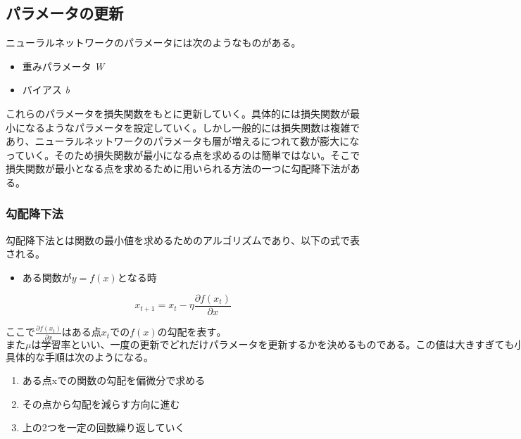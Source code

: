 \subsection{パラメータの更新}

ニューラルネットワークのパラメータには次のようなものがある。

\begin{itemize}
\item 重みパラメータ \sl{W}
\item バイアス \sl{b}
\end{itemize}

これらのパラメータを損失関数をもとに更新していく。具体的には損失関数が最小になるようなパラメータを設定していく。しかし一般的には損失関数は複雑であり、ニューラルネットワークのパラメータも層が増えるにつれて数が膨大になっていく。そのため損失関数が最小になる点を求めるのは簡単ではない。そこで損失関数が最小となる点を求めるために用いられる方法の一つに勾配降下法がある。

\begin{flushright}
\end{flushright}

\subsubsection{勾配降下法}
勾配降下法とは関数の最小値を求めるためのアルゴリズムであり、以下の式で表される。
\begin{itemize}
\item{$ある関数がy=f(x)となる時$}
\end{itemize}
\begin{equation}
x_{t+1}=x_t - \eta\frac{\partial f(x_t)}{\partial x}
\end{equation}

$ここで\frac{\partial f(x_t)}{\partial x}はある点x_tでのf(x)の勾配を表す。$
$また\mu は学習率といい、一度の更新でどれだけパラメータを更新するかを決めるものである。この値は大きすぎても小さすぎても学習がうまくいかなくなってしまう。そのため様々な値を試し、適当な大きさに設定していく必要がある。$
具体的な手順は次のようになる。

\begin{enumerate}
\item{ある点xでの関数の勾配を偏微分で求める}
\item{その点から勾配を減らす方向に進む}
\item{上の2つを一定の回数繰り返していく}
\end{enumerate}

